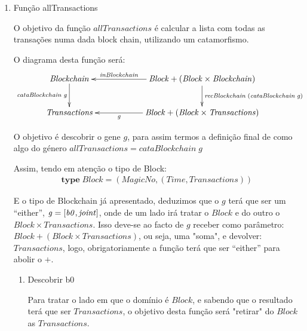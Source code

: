 \documentclass[a4paper]{article}
\newcommand{\Conid}[1]{\mathit{#1}}
\newcommand{\Varid}[1]{\mathit{#1}}
\begin{document}
\begin{enumerate}
\item Função allTransactions

O objetivo da função \ensuremath{\Varid{allTransactions}} é calcular a lista com todas as transações
numa dada block chain, utilizando um catamorfismo.

O diagrama desta função será:
\begin{eqnarray*}
\xymatrix@C=2cm{
    \ensuremath{\Conid{Blockchain}}
           \ar[d]_-{\ensuremath{\Varid{cataBlockchain}\;\Varid{g}}}
&
    \ensuremath{\Conid{Block}\mathbin{+}(\Conid{Block}\times\Conid{Blockchain})}
           \ar[d]^{\ensuremath{\Varid{recBlockchain}\;(\Varid{cataBlockchain}\;\Varid{g})}}
           \ar[l]_-{\ensuremath{\Varid{inBlockchain}}}
\\
     \ensuremath{\Conid{Transactions}}
&
     \ensuremath{\Conid{Block}\mathbin{+}(\Conid{Block}\times\Conid{Transactions})}
           \ar[l]^-{\ensuremath{\Varid{g}}}
}
\end{eqnarray*}


O objetivo é descobrir o gene \ensuremath{\Varid{g}}, para assim termos a definição final de como
algo do género \ensuremath{\Varid{allTransactions}\mathrel{=}\Varid{cataBlockchain}\;\Varid{g}}

Assim, tendo em atenção o tipo de Block:
\begin{eqnarray*}
\ensuremath{\mathbf{type}\;\Conid{Block}\mathrel{=}(\Conid{MagicNo},(\Conid{Time},\Conid{Transactions}))}
\end{eqnarray*}

E o tipo de Blockchain já apresentado, deduzimos que o \ensuremath{\Varid{g}} terá que ser um ``either'',
\ensuremath{\Varid{g}\mathrel{=}\alt{\Varid{b0}}{\Varid{joint}}},
onde de um lado irá tratar o \ensuremath{\Conid{Block}} e do outro o \ensuremath{\Conid{Block}\times\Conid{Transactions}}. Isso deve-se
ao facto de \ensuremath{\Varid{g}} receber como parâmetro: \ensuremath{\Conid{Block}\mathbin{+}(\Conid{Block}\times\Conid{Transactions})}, ou seja, uma
"soma", e devolver: \ensuremath{\Conid{Transactions}}, logo, obrigatoriamente a função terá que ser ``either''
para abolir o \ensuremath{\mathbin{+}}.


\begin{enumerate}
\item Descobrir b0

Para tratar o lado em que o domínio é \ensuremath{\Conid{Block}}, e sabendo que o resultado terá que
ser \ensuremath{\Conid{Transactions}}, o objetivo desta função será "retirar" do \ensuremath{\Conid{Block}} as \ensuremath{\Conid{Transactions}}.


\end{enumerate}
\end{enumerate}
\end{document}
